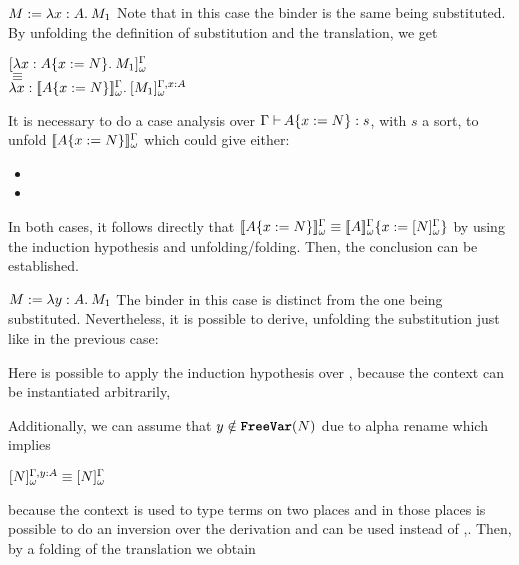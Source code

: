 \begin{Proof}
\begin{ProofCase}{$M \termDef \abs{x}{A}{M_1}$}
Note that in this case the binder is the same being substituted. By unfolding the definition of
substitution and the translation, we get
\begin{center}
$\WTrans{
    \abs{x}{\subst{A}{x}{N}}{M_1}
}$
\\ $\equiv$ \\
$\abs{x}{\WTypeTrans{\subst{A}{x}{N}}}{\WTrans[\typing{x}{A}]{M_1}}$
\end{center}
It is necessary to do a case analysis over $\ctyping{\subst{A}{x}{N}}{s}$, with $s$ a sort,
to unfold $\WTypeTrans{\subst{A}{x}{N}}$ which could give either:
\begin{itemize}
\item {}
\item {}
\end{itemize}
In both cases, it follows directly that 
$\WTypeTrans{\subst{A}{x}{N}} \equiv \subst{\WTypeTrans{A}}{x}{\WTrans{N}}$
by using the induction hypothesis and unfolding/folding. Then, the conclusion can be established.
\end{ProofCase}

\begin{ProofCase}{$M \termDef \abs{y}{A}{M_1}$}
The binder in this case is distinct from the one being substituted. Nevertheless, it is possible 
to derive, unfolding the substitution just like in the previous case:
\begin{center}
\end{center}
Here is possible to apply the induction hypothesis over , 
because the context can be instantiated arbitrarily,
\begin{center}
\end{center}
Additionally, we can assume that $y\notin\texttt{\textbf{FreeVar}}(N)$ due to alpha rename which implies 
\begin{center}
$
\WTrans[\typing{y}{A}]{N}
\equiv
\WTrans{N}
$
\end{center}
because the context is used to type terms on two places and in those places is 
possible to do an inversion over the derivation and \Context{} can be used instead of 
\Context{},. Then, by a folding of the translation we obtain
\begin{center}\end{center}
\end{ProofCase}


\end{Proof}
